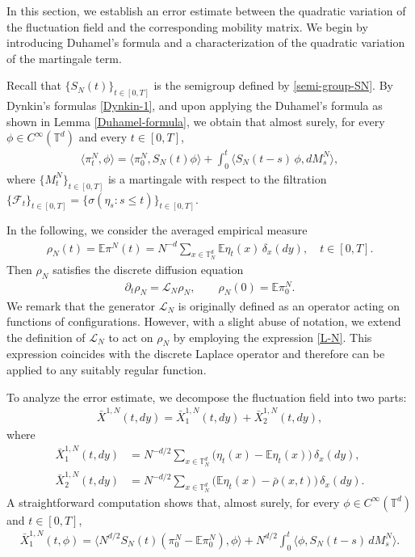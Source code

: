 \documentclass[UTF-8,reqno]{amsart}
\numberwithin{equation}{section}
\def\leq{\leqslant}
\def\leq{\leqslant}
\begin{document}
In this section, we establish an error estimate between the quadratic variation of the fluctuation field and the corresponding mobility matrix. We begin by introducing Duhamel's formula and a characterization of the quadratic variation of the martingale term. 

Recall that $\{S_N(t)\}_{t \in [0,T]}$ is the semigroup defined by \eqref{semi-group-SN}. By Dynkin's formulas \eqref{Dynkin-1}, and upon applying the Duhamel's formula as shown in Lemma \ref{Duhamel-formula}, we obtain that almost surely, for every $\phi \in C^{\infty}(\mathbb{T}^d)$ and every $t\in[0,T]$, 
\begin{align}\label{mild-form-ips}
\langle \pi^N_t, \phi \rangle = \langle  \pi^N_0, S_N(t)\phi \rangle + \int_0^t \langle S_N(t - s) \, \phi,  dM^N_s \rangle,
\end{align}
where $\{M^N_t\}_{t \in [0,T]}$ is a martingale with respect to the filtration $\{\mathcal{F}_t\}_{t \in [0,T]} = \{\sigma(\eta_s : s \leq t)\}_{t \in [0,T]}$.

In the following, we consider the averaged empirical measure 
\begin{align}\label{discrete-heateq}
\rho_N(t) = \mathbb{E} \pi^N(t) = N^{-d} \sum_{x \in \mathbb{T}^d_N} \mathbb{E} \eta_t(x) \, \delta_{x}(dy), \quad t \in [0,T].
\end{align}
Then $\rho_N$ satisfies the discrete diffusion equation
\begin{align}\label{disc-diffusion-eq}
\partial_t \rho_N = \mathcal{L}_N \rho_N, \qquad \rho_N(0) = \mathbb{E} \pi^N_0.
\end{align}
We remark that the generator $\mathcal{L}_N$ is originally defined as an operator acting on functions of configurations. However, with a slight abuse of notation, we extend the definition of $\mathcal{L}_N$ to act on $\rho_N$ by employing the expression \eqref{L-N}. This expression coincides with the discrete Laplace operator and therefore can be applied to any suitably regular function.


To analyze the error estimate, we decompose the fluctuation field into two parts:
\begin{align*}
\bar{X}^{1,N}(t, dy) = \bar{X}^{1,N}_1(t, dy) + \bar{X}^{1,N}_2(t, dy),
\end{align*}
where
\begin{align}
\bar{X}^{1,N}_1(t, dy) &= N^{-d/2} \sum_{x \in \mathbb{T}^d_N} \big( \eta_t(x) - \mathbb{E}\eta_t(x) \big) \, \delta_{x}(dy), \label{X11}\\
\bar{X}^{1,N}_2(t, dy) &= N^{-d/2} \sum_{x \in \mathbb{T}^d_N} \big( \mathbb{E}\eta_t(x) - \bar{\rho}(x, t) \big) \, \delta_{x}(dy).\label{X12}
\end{align}
A straightforward computation shows that, almost surely, for every $\phi \in C^{\infty}(\mathbb{T}^d)$ and $t \in [0,T]$,
\begin{align*}
\bar{X}^{1,N}_1(t, \phi) = \langle N^{d/2}S_N(t)(\pi^N_0 - \mathbb{E} \pi^N_0), \phi \rangle + N^{d/2} \int_0^t \langle \phi, S_N(t - s) \, dM^N_s \rangle.
\end{align*}
\end{document}
